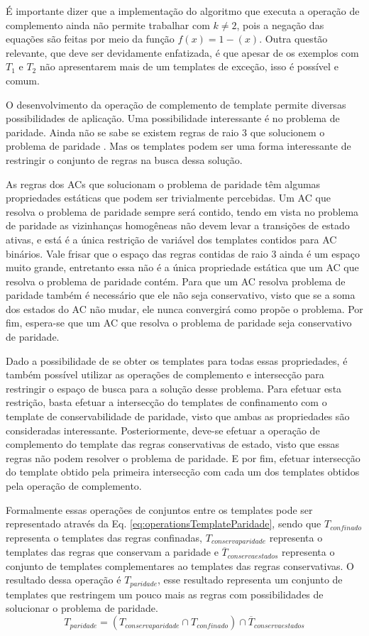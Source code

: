 É importante dizer que a implementação do algoritmo que executa a operação de complemento ainda não permite trabalhar com $k\neq 2$, pois a negação das equações são feitas por meio da função $f(x) = 1 - (x)$. Outra questão relevante, que deve ser devidamente enfatizada, é que apesar de os exemplos com $T_1$ e $T_2$ não apresentarem mais de um templates de exceção, isso é possível e comum.

O desenvolvimento da operação de complemento de template permite diversas possibilidades de aplicação. 
Uma possibilidade interessante é no problema de paridade. 
Ainda não se sabe se existem regras de raio 3 que solucionem o problema de paridade \cite{Betel2013}. 
Mas os templates podem ser uma forma interessante de restringir o conjunto de regras na busca dessa solução.

As regras dos ACs que solucionam o problema de paridade têm algumas propriedades estáticas que podem ser trivialmente percebidas. 
Um AC que resolva o problema de paridade sempre será contido, tendo em vista no problema de paridade as vizinhanças homogêneas não devem levar a transições de estado ativas, e está é a única restrição de variável dos templates contidos para AC binários. 
Vale frisar que o espaço das regras contidas de raio 3 ainda é um espaço muito grande, entretanto essa não é a única propriedade estática que um AC que resolva o problema de paridade contém. 
Para que um AC resolva problema de paridade também é necessário que ele não seja conservativo, visto que se a soma dos estados do AC não mudar, ele nunca convergirá como propõe o problema. 
Por fim, espera-se que um AC que resolva o problema de paridade seja conservativo de paridade.

Dado a possibilidade de se obter os templates para todas essas propriedades, é também possível utilizar as operações de complemento e intersecção para restringir o espaço de busca para a solução desse problema.
Para efetuar esta restrição, basta efetuar a intersecção do templates de confinamento com o template de conservabilidade de paridade, visto que ambas as propriedades são consideradas interessante. 
Posteriormente, deve-se efetuar a operação de complemento do template das regras conservativas de estado, visto que essas regras não podem resolver o problema de paridade. 
E por fim, efetuar intersecção do template obtido pela primeira intersecção com cada um dos templates obtidos pela operação de complemento.

Formalmente essas operações de conjuntos entre os templates pode ser representado através da Eq. \eqref{eq:operationsTemplateParidade}, sendo que $T_{confinado}$ representa o templates das regras confinadas, $T_{conservaparidade}$ representa o templates das regras que conservam a paridade e $\overline{T}_{conservaestados}$ representa o conjunto de templates complementares ao templates das regras conservativas. O resultado dessa operação é $T_{paridade}$, esse resultado representa um conjunto de templates que restringem um pouco mais as regras com possibilidades de solucionar o problema de paridade.
\begin{equation}
T_{paridade} = (T_{conservaparidade} \cap T_{confinado}) \cap \overline{T}_{conservaestados}
\label{eq:operationsTemplateParidade}
\end{equation}